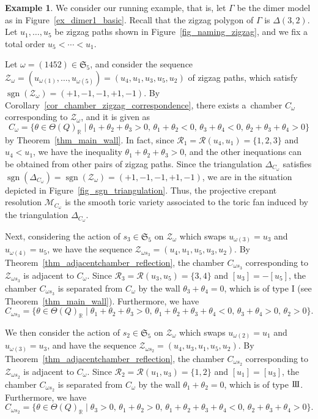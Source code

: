 \documentclass[10pt,a4paper]{amsart}
\numberwithin{equation}{section}
\theoremstyle{definition}
\newtheorem{Example}[Theorem]{Example}
\newcommand{\RR}{\mathbb{R}}
\newcommand{\calM}{\mathcal{M}}
\newcommand{\calR}{\mathcal{R}}
\newcommand{\calZ}{\mathcal{Z}}
\newcommand{\fkS}{\mathfrak{S}}
\newcommand{\sgn}{\operatorname{sgn}}
\newcommand{\typeIII}{{\rm I\hspace{-0.7pt}I\hspace{-0.7pt}I}}
\newcommand{\permII}{\omega}
\begin{document}
\begin{Example}
\label{ex_compute_chamber_zigzag}
We consider our running example, that is, let $\Gamma$ be the dimer model as in Figure~\ref{ex_dimer1_basic}.
Recall that the zigzag polygon of $\Gamma$ is $\Delta(3,2)$.
Let $u_1, \dots, u_5$ be zigzag paths shown in Figure~\ref{fig_naming_zigzag}, and we fix a total order $u_5<\cdots<u_1$.

Let $\permII=(1452)\in\fkS_5$, and consider the sequence $\calZ_\permII=(u_{\permII(1)}, \dots, u_{\permII(5)})=(u_4,u_1,u_3,u_5,u_2)$ of zigzag paths,
which satisfy $\sgn(\calZ_\permII)=(+1,-1,-1,+1,-1)$.
By Corollary~\ref{cor_chamber_zigzag_correspondence},
there exists a~chamber $C_\permII$ corresponding to $\calZ_\permII$, and it is given as
\begin{equation*}%
C_\permII=\{\theta\in\Theta(Q)_\RR \mid \theta_1+\theta_2+\theta_3>0, \, \theta_1+\theta_2<0, \, \theta_3+\theta_4<0, \, \theta_2+\theta_3+\theta_4>0\}
\end{equation*}
by Theorem~\ref{thm_main_wall}.
In fact, since $\calR_1=\calR(u_4,u_1)=\{1,2,3\}$ and $u_4<u_1$, we have the inequality $\theta_1+\theta_2+\theta_3>0$,
and the other inequations can be obtained from other pairs of zigzag paths.
Since the triangulation $\Delta_{C_\permII}$ satisfies $\sgn(\Delta_{C_\permII})=\sgn(\calZ_\permII)=(+1,-1,-1,+1,-1)$,
we are in the situation depicted in Figure~\ref{fig_sgn_triangulation}.
Thus, the projective crepant resolution $\calM_{C_\permII}$ is the smooth toric variety associated to the toric fan induced by the triangulation $\Delta_{C_\permII}$.

Next, considering the action of $s_3\in\fkS_5$ on $\calZ_\permII$ which swaps $u_{\permII(3)}=u_3$ and $u_{\permII(4)}=u_5$,
we have the sequence $\calZ_{\permII s_3}=(u_4,u_1,u_5,u_3,u_2)$.
By Theorem~\ref{thm_adjacentchamber_reflection}, the chamber $C_{\permII s_3}$ corresponding to $\calZ_{\permII s_3}$ is adjacent to $C_\permII$.
Since $\calR_3=\calR(u_3,u_5)=\{3,4\}$ and $[u_3]=-[u_5]$,
the chamber $C_{\permII s_3}$ is separated from $C_\permII$ by the wall $\theta_3+\theta_4=0$, which is of type I (see Theorem~\ref{thm_main_wall}).
Furthermore, we have
\[
C_{\permII s_3}=\{\theta\in\Theta(Q)_\RR \mid \theta_1+\theta_2+\theta_3>0, \, \theta_1+\theta_2+\theta_3+\theta_4<0, \,
\theta_3+\theta_4>0, \, \theta_2>0\}.
\]

We then consider the action of $s_2\in\fkS_5$ on $\calZ_\permII$ which swaps $u_{\permII(2)}=u_1$ and $u_{\permII(3)}=u_3$,
and have the sequence $\calZ_{\permII s_2}=(u_4,u_3,u_1,u_5,u_2)$.
By Theorem~\ref{thm_adjacentchamber_reflection}, the chamber $C_{\permII s_2}$ corresponding to $\calZ_{\permII s_2}$ is adjacent to $C_\permII$.
Since $\calR_2=\calR(u_1,u_3)=\{1,2\}$ and $[u_1]= [u_3]$,
the chamber $C_{\permII s_2}$ is separated from $C_\permII$ by the wall $\theta_1+\theta_2=0$, which is of type $\typeIII$.
Furthermore, we have
\[
C_{\permII s_2}=\{\theta\in\Theta(Q)_\RR \mid \theta_3>0, \, \theta_1+\theta_2>0, \, \theta_1+\theta_2+\theta_3+\theta_4<0, \,
\theta_2+\theta_3+\theta_4>0\}.
\]
\end{Example}
\end{document}
